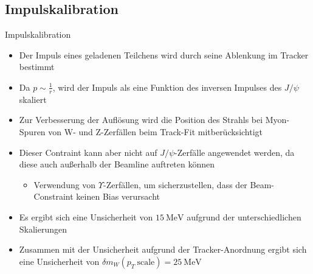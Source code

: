 \documentclass[aspectratio=1610, 9pt]{beamer}
\begin{document}
\subsection{Impulskalibration}

\begin{frame}{Impulskalibration}
  \begin{itemize}
    \item Der Impuls eines geladenen Teilchens wird durch seine Ablenkung im Tracker bestimmt
    \item Da $p \sim \frac{1}{r}$, wird der Impuls als eine Funktion des inversen Impulses des $J/\psi$ skaliert
    \item Zur Verbesserung der Auflösung wird die Position des Strahls bei Myon-Spuren von W- und Z-Zerfällen beim Track-Fit mitberücksichtigt
  \end{itemize}
\end{frame}

\begin{frame}
  \begin{itemize}
    \item Dieser Contraint kann aber nicht auf $J/\psi$-Zerfälle angewendet werden, da diese auch außerhalb der Beamline auftreten können
    \begin{itemize}
      \item[\rightarrow] Verwendung von $\Upsilon$-Zerfällen, um sicherzustellen, dass der Beam-Constraint keinen Bias verursacht
    \end{itemize}
    \item Es ergibt sich eine Unsicherheit von $\SI{15}{\MeV}$ aufgrund der unterschiedlichen Skalierungen
    \item Zusammen mit der Unsicherheit aufgrund der Tracker-Anordnung ergibt sich eine Unsicherheit von $\delta m_W (p_T \: \text{scale}) = \SI{25}{\MeV}$
  \end{itemize}
\end{frame}
\end{document}
